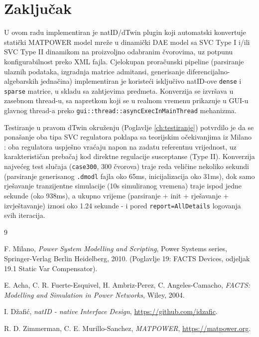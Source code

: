 \documentclass[11pt,a4paper]{report}
\begin{document}
\chapter{Zaključak}
\label{ch:zakljucak}

U ovom radu implementiran je natID/dTwin plugin koji automatski konvertuje statički
MATPOWER model mreže u dinamički DAE model sa SVC Type I i/ili SVC Type II dinamikom na
proizvoljno odabranim čvorovima, uz potpunu konfigurabilnost preko XML fajla. Cjelokupan
proračunski pipeline (parsiranje ulaznih podataka, izgradnja matrice admitansi,
generisanje diferencijalno-algebarskih jednačina) implementiran je koristeći isključivo
natID-ove \texttt{dense} i \texttt{sparse} matrice, u skladu sa zahtjevima predmeta.
Konverzija se izvršava u zasebnom thread-u, sa napretkom koji se u realnom vremenu
prikazuje u GUI-u glavnog thread-a preko \texttt{gui::thread::\allowbreak asyncExecInMainThread}
mehanizma.

Testiranje u pravom dTwin okruženju (Poglavlje \ref{ch:testiranje})
potvrdilo je da se ponašanje oba tipa SVC regulatora poklapa sa teorijskim očekivanjima iz
Milano \cite{milano2010psms}: oba regulatora uspješno vraćaju napon na zadatu referentnu
vrijednost, uz karakterističan prebačaj kod direktne regulacije susceptanse (Type II).
Konverzija najvećeg test slučaja (\texttt{case300}, 300 čvorova) traje reda veličine
nekoliko sekundi (parsiranje generisanog \texttt{.dmodl} fajla oko 65ms, inicijalizacija
oko 31ms), dok samo rješavanje tranzijentne simulacije (10s simuliranog vremena) traje
ispod jedne sekunde (oko 938ms), a ukupno vrijeme (parsiranje + init + rješavanje +
izvještavanje) iznosi oko 1.24 sekunde - i pored \texttt{report=AllDetails} logovanja svih
iteracija.


\begin{thebibliography}{9}

F. Milano, \emph{Power System Modelling and Scripting}, Power Systems series,
Springer-Verlag Berlin Heidelberg, 2010. (Poglavlje 19: FACTS Devices, odjeljak 19.1
Static Var Compensator).

E. Acha, C. R. Fuerte-Esquivel, H. Ambriz-Perez, C. Angeles-Camacho, \emph{FACTS:
Modelling and Simulation in Power Networks}, Wiley, 2004.

I. Džafić, \emph{natID - native Interface Design}, \url{https://github.com/idzafic}.

R. D. Zimmerman, C. E. Murillo-Sanchez, \emph{MATPOWER}, \url{https://matpower.org}.

\end{thebibliography}
\end{document}
